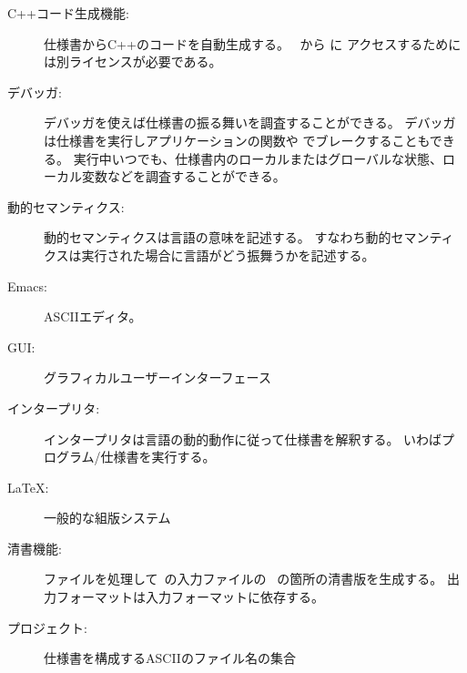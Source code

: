 \begin{description}

  
\item[C++コード生成機能:] 仕様書からC++のコードを自動生成する。
  \Toolbox\ から に
  アクセスするためには別ライセンスが必要である。
  

\item[デバッガ:] デバッガを使えば仕様書の振る舞いを調査することができる。
  デバッガは仕様書を実行しアプリケーションの関数や
   でブレークすることもできる。
  実行中いつでも、仕様書内のローカルまたはグローバルな状態、ローカル変数などを調査することができる。\\



\item[動的セマンティクス:] 動的セマンティクスは言語の意味を記述する。
  すなわち動的セマンティクスは実行された場合に言語がどう振舞うかを記述する。


\item[Emacs:] ASCIIエディタ。


\item[GUI:] グラフィカルユーザーインターフェース



\item[インタープリタ:] インタープリタは言語の動的動作に従って仕様書を解釈する。
  いわばプログラム/仕様書を実行する。\\

 
 

\item[\LaTeX:] 一般的な組版システム


\item[清書機能:] ファイルを処理して\vdmslpp\ の入力ファイルの
  \vdmslpp\ の箇所の清書版を生成する。
  出力フォーマットは入力フォーマットに依存する。


\item[プロジェクト:] 仕様書を構成するASCIIのファイル名の集合



\end{description}
